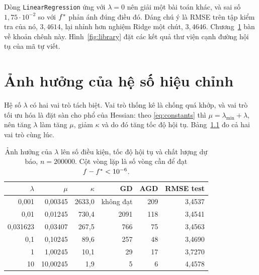 \documentclass[12pt, a4paper, oneside]{report}
\theoremstyle{definition}
\begin{document}
Dòng \texttt{LinearRegression} ứng với $\lambda = 0$ nên giải một bài toán khác,
và sai số $1{,}75 \cdot 10^{-2}$ so với $f^{*}$ phản ánh đúng điều đó. Đáng chú
ý là RMSE trên tập kiểm tra của nó, $3{,}4614$, lại nhỉnh hơn nghiệm Ridge một
chút, $3{,}4646$. Chương~\ref{ch:lambda} bàn về khoản chênh này. Hình~\ref{fig:library} đặt các kết
quả thư viện cạnh đường hội tụ của mã tự viết.


\chapter{Ảnh hưởng của hệ số hiệu chỉnh}\label{ch:lambda}

Hệ số $\lambda$ có hai vai trò tách biệt. Vai trò thống kê là chống quá khớp, và
vai trò tối ưu hóa là đặt sàn cho phổ của Hessian: theo \eqref{eq:constants} thì
$\mu = \lambda_{\min} + \lambda$, nên tăng $\lambda$ làm tăng $\mu$, giảm $\kappa$
và do đó tăng tốc độ hội tụ. Bảng~\ref{tab:lambda} đo cả hai vai trò cùng lúc.

\begin{table}[tbp]
  \centering
  \caption{Ảnh hưởng của $\lambda$ lên số điều kiện, tốc độ hội tụ và chất lượng
    dự báo, $n = \num{200000}$. Cột vòng lặp là số vòng cần để đạt
    $f - f^{*} < 10^{-6}$.}
  \label{tab:lambda}
  \begin{tabular}{rrrrrr}
    \toprule
    $\lambda$ & $\mu$ & $\kappa$ & GD & AGD & RMSE test \\
    \midrule
    0{,}001    & 0{,}00345  & 2633{,}0 & không đạt & 209 & 3{,}4537 \\
    0{,}01     & 0{,}01245  & 730{,}4  & 2091      & 118 & 3{,}4541 \\
    0{,}031623 & 0{,}03407  & 267{,}5  & 766       & 75  & 3{,}4563 \\
    0{,}1      & 0{,}10245  & 89{,}6   & 257       & 48  & 3{,}4690 \\
    1          & 1{,}00245  & 10{,}1   & 29        & 17  & 3{,}7270 \\
    10         & 10{,}00245 & 1{,}9    & 5         & 6   & 4{,}4578 \\
    \bottomrule
  \end{tabular}
\end{table}
\end{document}
